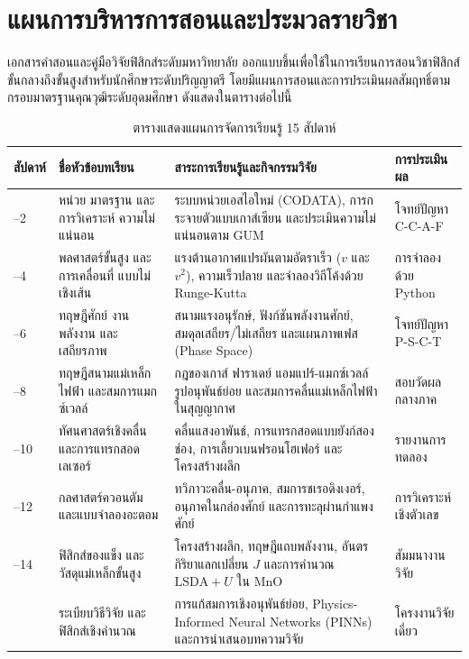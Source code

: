 \chapter*{แผนการบริหารการสอนและประมวลรายวิชา}

เอกสารคำสอนและคู่มือวิจัยฟิสิกส์ระดับมหาวิทยาลัย ออกแบบขึ้นเพื่อใช้ในการเรียนการสอนวิชาฟิสิกส์ขั้นกลางถึงขั้นสูงสำหรับนักศึกษาระดับปริญญาตรี โดยมีแผนการสอนและการประเมินผลสัมฤทธิ์ตามกรอบมาตรฐานคุณวุฒิระดับอุดมศึกษา ดังแสดงในตารางต่อไปนี้

\vspace{0.4cm}
\begin{table}[htbp]
\centering
\small
\begin{tabularx}{\textwidth}{>{\centering\arraybackslash}p{1.3cm} >{\raggedright\arraybackslash}p{3.7cm} >{\raggedright\arraybackslash}X >{\raggedright\arraybackslash}p{2.6cm}}
\toprule
\textbf{สัปดาห์} & \textbf{ชื่อหัวข้อบทเรียน} & \textbf{สาระการเรียนรู้และกิจกรรมวิจัย} & \textbf{การประเมินผล} \\
\midrule
1--2 & หน่วย มาตรฐาน และการวิเคราะห์ ความไม่แน่นอน & ระบบหน่วยเอสไอใหม่ (CODATA), การกระจายตัวแบบเกาส์เซียน และประเมินความไม่แน่นอนตาม GUM & โจทย์ปัญหา C-C-A-F \\
3--4 & พลศาสตร์ขั้นสูง และการเคลื่อนที่ แบบไม่เชิงเส้น & แรงต้านอากาศแปรผันตามอัตราเร็ว ($v$ และ $v^2$), ความเร็วปลาย และจำลองวิถีโค้งด้วย Runge-Kutta & การจำลองด้วย Python \\
5--6 & ทฤษฎีศักย์ งาน พลังงาน และเสถียรภาพ & สนามแรงอนุรักษ์, ฟังก์ชันพลังงานศักย์, สมดุลเสถียร/ไม่เสถียร และแผนภาพเฟส (Phase Space) & โจทย์ปัญหา P-S-C-T \\
7--8 & ทฤษฎีสนามแม่เหล็กไฟฟ้า และสมการแมกซ์เวลล์ & กฎของเกาส์ ฟาราเดย์ แอมแปร์-แมกซ์เวลล์ รูปอนุพันธ์ย่อย และสมการคลื่นแม่เหล็กไฟฟ้าในสุญญากาศ & สอบวัดผลกลางภาค \\
9--10 & ทัศนศาสตร์เชิงคลื่น และการแทรกสอดเลเซอร์ & คลื่นแสงอาพันธ์, การแทรกสอดแบบยังก์สองช่อง, การเลี้ยวเบนฟรอนโฮเฟอร์ และโครงสร้างผลึก & รายงานการทดลอง \\
11--12 & กลศาสตร์ควอนตัม และแบบจำลองอะตอม & ทวิภาวะคลื่น-อนุภาค, สมการชเรอดิงเงอร์, อนุภาคในกล่องศักย์ และการทะลุผ่านกำแพงศักย์ & การวิเคราะห์เชิงตัวเลข \\
13--14 & ฟิสิกส์ของแข็ง และวัสดุแม่เหล็กขั้นสูง & โครงสร้างผลึก, ทฤษฎีแถบพลังงาน, อันตรกิริยาแลกเปลี่ยน $J$ และการคำนวณ $\text{LSDA}+U$ ใน $\text{MnO}$ & สัมมนางานวิจัย \\
15 & ระเบียบวิธีวิจัย และฟิสิกส์เชิงคำนวณ & การแก้สมการเชิงอนุพันธ์ย่อย, Physics-Informed Neural Networks (PINNs) และการนำเสนอบทความวิจัย & โครงงานวิจัยเดี่ยว \\
\bottomrule
\end{tabularx}
\caption*{ตารางแสดงแผนการจัดการเรียนรู้ 15 สัปดาห์}
\end{table}

